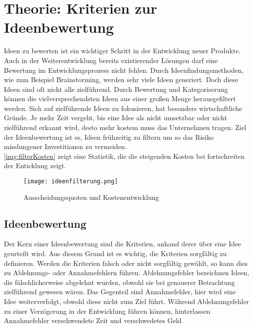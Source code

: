 \newpage
\section{Theorie: Kriterien zur Ideenbewertung}\label{sec:theorie}
Ideen zu bewerten ist ein wichtiger Schritt in der Entwicklung neuer Produkte. 
Auch in der Weiterentwicklung bereits existierender Lösungen darf eine Bewertung im Entwicklungsprozess nicht fehlen. 
Durch Ideenfindungsmethoden, wie zum Beispiel Brainstorming, werden sehr viele Ideen generiert. Doch diese Ideen 
sind oft nicht alle zielführend. 
Durch Bewertung und Kategoriserung können die vielversprechendsten Ideen aus einer großen Menge herausgefiltert werden. 
Sich auf zielführende Ideen zu fokusieren, hat besonders wirtschaftliche Gründe.
Je mehr Zeit vergeht, bis eine Idee als nicht umsetzbar oder nicht zielführend erkannt wird, desto mehr kostem muss das Unternehmen tragen.
Ziel der Ideenbewertung ist es, Ideen frühzeitig zu filtern um so das Risiko misslungener Investitionen zu vermeiden.
\cite{grossklaus:2008}\\
\autoref{img:filterKosten} zeigt eine Statistik, die die steigenden Kosten bei fortschreiten der Enticklung zeigt. 
\begin{figure}[h]
	\centering
	\texttt{[image: ideenfilterung.png]}
	\caption{Ausscheidungsquoten und Kostenentwicklung}
	\label{img:filterKosten}
\end{figure}

\subsection{Ideenbewertung}
Der Kern einer Ideenbewertung sind die Kriterien, anhand derer über eine Idee geurteilt wird.
Aus diesem Grund ist es wichtig, die Kriterien sorgfältig zu definieren. Werden die Kriterien falsch oder nicht sorgfältig gewählt,
so kann dies zu Ablehnungs- oder Annahmefehlern führen. 
Ablehnungsfehler bezeichnen Ideen, die fälschlicherweise abgelehnt wurden, obwohl sie bei genauerer Betrachtung 
zielführend gewesen wären. Das Gegenteil sind Annahmefehler, hier wird eine Idee weiterverfolgt, obwohl diese nicht zum Ziel führt. 
Während Ablehnungsfehler zu einer Verzögerung in der Entwicklung führen können, hinterlassen Annahmefehler verschwendete Zeit und verschwedetes Geld.\\

